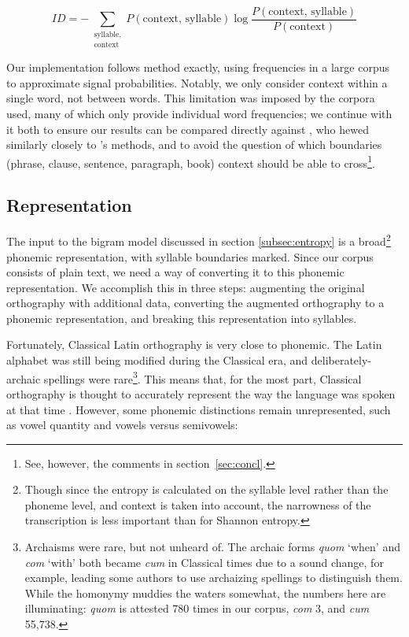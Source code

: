 \documentclass[12pt,twoside]{article}
\begin{document}
\begin{equation}
\label{eq:id}
ID = - \sum_{\substack{\textrm{syllable},\\\textrm{context}}} P(\textrm{context, syllable}) \log \frac{P(\textrm{context, syllable})}{P(\textrm{context})}
\end{equation}

Our implementation follows  method exactly, using frequencies in a large corpus to approximate signal probabilities. Notably, we only consider context within a single word, not between words. This limitation was imposed by the corpora \citeauthor{oh} used, many of which only provide individual word frequencies; we continue with it both to ensure our results can be compared directly against , who hewed similarly closely to \citeauthor{oh}'s methods, and to avoid the question of which boundaries (phrase, clause, sentence, paragraph, book) context should be able to cross\footnote{See, however, the comments in section~\ref{sec:concl}.}.

\subsection{Representation}
\label{subsec:repr}

The input to the bigram model discussed in section \ref{subsec:entropy} is a broad\footnote{Though since the entropy is calculated on the syllable level rather than the phoneme level, and context is taken into account, the narrowness of the transcription is less important than for Shannon entropy.} phonemic representation, with syllable boundaries marked. Since our corpus consists of plain text, we need a way of converting it to this phonemic representation. We accomplish this in three steps: augmenting the original orthography with additional data, converting the augmented orthography to a phonemic representation, and breaking this representation into syllables.

Fortunately, Classical Latin orthography is very close to phonemic. The Latin alphabet was still being modified during the Classical era, and deliberately-archaic spellings were rare\footnote{Archaisms were rare, but not unheard of. The archaic forms \emph{quom} `when' and \emph{com} `with' both became \emph{cum} in Classical times due to a sound change, for example, leading some authors to use archaizing spellings to distinguish them. While the homonymy muddies the waters somewhat, the numbers here are illuminating: \emph{quom} is attested 780 times in our corpus, \emph{com} 3, and \emph{cum} 55,738.}. This means that, for the most part, Classical orthography is thought to accurately represent the way the language was spoken at that time \citep[9]{allen}. However, some phonemic distinctions remain unrepresented, such as vowel quantity and vowels versus semivowels:
\end{document}
